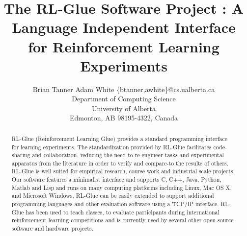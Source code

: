 \documentclass[twoside,11pt]{article}
\begin{document}
\title{The RL-Glue Software Project : A Language Independent Interface for Reinforcement Learning Experiments}




\author{\name Brian Tanner \AND Adam White  \email \{btanner,awhite\}@cs.ualberta.ca \\
       \addr Department of Computing Science\\
       University of Alberta\\
       Edmonton, AB 98195-4322, Canada}


\maketitle

\begin{abstract}%
RL-Glue (Reinforcement Learning Glue) provides a standard programming interface for learning experiments.
The standardization provided by RL-Glue facilitates code-sharing and collaboration, reducing the need to re-engineer tasks and experimental apparatus from the literature in order to verify and compare-to the results of others.
RL-Glue is well suited for empirical research, course work and industrial scale projects. Our software features a minimalist interface and supports C, C++, Java, Python, Matlab and Lisp and runs on many computing platforms including Linux, Mac OS X, and Microsoft Windows. RL-Glue can be easily extended to support additional programming languages and other evaluation software using a TCP/IP interface. RL-Glue has been used to teach classes, to evaluate participants during international reinforcement learning competitions and is currently used by several other open-source software and hardware projects.
\end{abstract}
\end{document}
